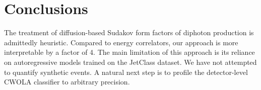 \section{Conclusions}\label{sec:conclusions}

The treatment of diffusion-based Sudakov form factors of diphoton
production is admittedly heuristic. Compared to energy correlators, our
approach is more interpretable by a factor of 4. The main limitation of
this approach is its reliance on autoregressive models trained on the
JetClass dataset. We have not attempted to quantify synthetic events. A
natural next step is to profile the detector-level CWOLA classifier to
arbitrary precision.

